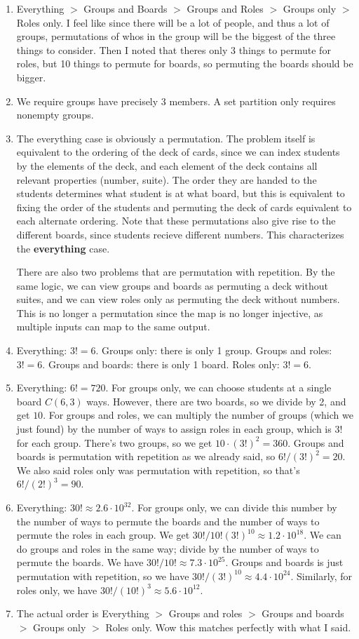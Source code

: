 \documentclass[11pt, letterpaper]{report}
\begin{document}
\begin{enumerate}
	\item Everything $>$ Groups and Boards $>$ Groups and Roles $>$ Groups only $>$ Roles only. I feel like since there will be a lot of people, and thus a lot of groups, permutations of whos in the group will be the biggest of the three things to consider. Then I noted that theres only 3 things to permute for roles, but 10 things to permute for boards, so permuting the boards should be bigger.
	\item We require groups have precisely 3 members. A set partition only requires nonempty groups.
	\item The everything case is obviously a permutation. The problem itself is equivalent to the ordering of the deck of cards, since we can index students by the elements of the deck, and each element of the deck contains all relevant properties (number, suite). The order they are handed to the students determines what student is at what board, but this is equivalent to fixing the order of the students and permuting the deck of cards equivalent to each alternate ordering. Note that these permutations also give rise to the different boards, since students recieve different numbers. This characterizes the \textbf{everything} case.


	There are also two problems that are permutation with repetition. By the same logic, we can view groups and boards as permuting a deck without suites, and we can view roles only as permuting the deck without numbers. This is no longer a permutation since the map is no longer injective, as multiple inputs can map to the same output.
	\item Everything: $3! =6$. Groups only: there is only 1 group. Groups and roles: $3! =6$. Groups and boards: there is only 1 board. Roles only: $3! =6$.
	\item Everything: $6! =720$. For groups only, we can choose students at a single board $C(6,3)$ ways. However, there are two boards, so we divide by 2, and get $10$. For groups and roles, we can multiply the number of groups (which we just found) by the number of ways to assign roles in each group, which is $3!$ for each group. There's two groups, so we get $10\cdot (3!)^2=360$. Groups and boards is permutation with repetition as we already said, so $6!/(3!)^2=20$. We also said roles only was permutation with repetition, so that's $6! /(2!)^3=90$.
	\item Everything: $30!\approx 2.6\cdot 10^{32}$. For groups only, we can divide this number by the number of ways to permute the boards and the number of ways to permute the roles in each group. We get $30! /10!(3!)^{10}\approx 1.2\cdot 10^{18}$. We can do groups and roles in the same way; divide by the number of ways to permute the boards. We have $30! /10! \approx 7.3\cdot 10^{25}$. Groups and boards is just permutation with repetition, so we have $30!/(3!)^{10}\approx 4.4\cdot 10^{24}$. Similarly, for roles only, we have $30!/(10!)^3\approx 5.6\cdot 10^{12}$.
	\item The actual order is Everything $>$ Groups and roles $>$ Groups and boards $>$ Groups only $>$ Roles only. Wow this matches perfectly with what I said.
\end{enumerate}
\end{document}
